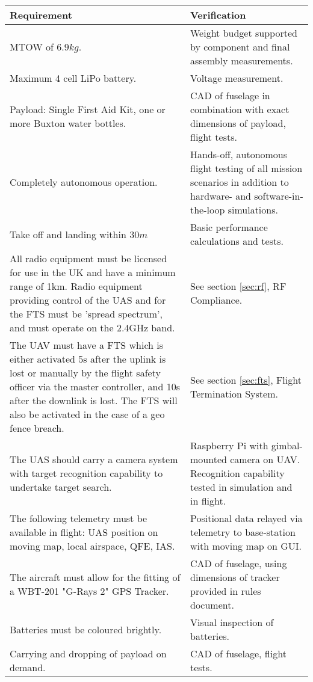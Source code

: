 \begin{longtable}{@{\makebox[0.08\textwidth][l]{\rownumber}} | p{} | p{}}
	\textbf{Requirement} & \textbf{Verification} 
	\gdef\rownumber{Req.\space\stepcounter{magicrownumbers}\arabic{magicrownumbers}} \\ \hline
	MTOW of $6.9kg$. & Weight budget supported by component and final assembly measurements.\\ \hline
	Maximum 4 cell LiPo battery. & Voltage measurement. \\ \hline
	Payload: Single First Aid Kit, one or more Buxton water bottles. & CAD of fuselage in combination with exact dimensions of payload, flight tests. \\ \hline
	Completely autonomous operation. & Hands-off, autonomous flight testing of all mission scenarios in addition to hardware- and software-in-the-loop simulations. \\ \hline
	Take off and landing within $30\si{m}$ & Basic performance calculations and tests. \\ \hline
	All radio equipment must be licensed for use in the UK and have a minimum range of 1km. Radio equipment providing control of the UAS and for the FTS must be 'spread spectrum', and must operate on the 2.4GHz band. & See section \ref{sec:rf}, RF Compliance. \\ \hline
	The UAV must have a FTS which is either activated 5s after the uplink is lost or manually by the flight safety officer via the master controller, and 10s after the downlink is lost. The FTS will also be activated in the case of a geo fence breach. & See section \ref{sec:fts}, Flight Termination System. \\ \hline
	The UAS should carry a camera system with target recognition capability to undertake target search. & Raspberry Pi with gimbal-mounted camera on UAV. Recognition capability tested in simulation and in flight. \\ \hline
	The following telemetry must be available in flight: UAS position on moving map, local airspace, QFE, IAS. & Positional data relayed via telemetry to base-station with moving map on GUI. \\ \hline
	The aircraft must allow for the fitting of a WBT-201 "G-Rays 2" GPS Tracker. & CAD of fuselage, using dimensions of tracker provided in rules document. \\ \hline
	Batteries must be coloured brightly. & Visual inspection of batteries. \\ \hline
	Carrying and dropping of payload on demand. & CAD of fuselage, flight tests.\\ \hline

\end{longtable}
